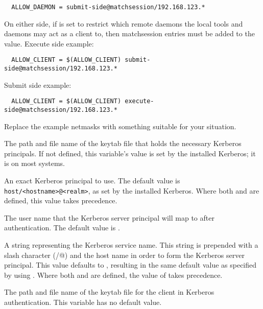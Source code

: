 \begin{description}
\begin{verbatim}
  ALLOW_DAEMON = submit-side@matchsession/192.168.123.*
\end{verbatim}

  On either side, if  is set to restrict which
  remote daemons the local tools and daemons may act as a client to, then
  matchsession entries must be added to the  value.
  Execute side example:

\begin{verbatim}
  ALLOW_CLIENT = $(ALLOW_CLIENT) submit-side@matchsession/192.168.123.*
\end{verbatim}

  Submit side example:

\begin{verbatim}
  ALLOW_CLIENT = $(ALLOW_CLIENT) execute-side@matchsession/192.168.123.*
\end{verbatim}

  Replace the example netmasks with something suitable for your situation.

\label{param:KerberosServerKeytab}
\item[\Macro{KERBEROS\_SERVER\_KEYTAB}]
  The path and file name of the keytab file that holds the necessary Kerberos
  principals.
  If not defined, this variable's value is set by the installed Kerberos;
  it is  on most systems.

\label{param:KerberosServerPrincipal}
\item[\Macro{KERBEROS\_SERVER\_PRINCIPAL}]
  An exact Kerberos principal to use.
  The default value is \verb$host/<hostname>@<realm>$, as set by the
  installed Kerberos.
  Where both  and
   are defined, this value takes
  precedence.

\label{param:KerberosServerUser}
\item[\Macro{KERBEROS\_SERVER\_USER}]
  The user name that the Kerberos server principal will map to after
  authentication.
  The default value is \verb@condor@.

\label{param:KerberosServerService}
\item[\Macro{KERBEROS\_SERVER\_SERVICE}]
  A string representing the Kerberos service name.
  This string is prepended with a slash character (\verb@/@) and the host name
  in order to form the Kerberos server principal.
  This value defaults to \verb@host@, resulting in the same default value
  as specified by using .
  Where both  and
   are defined, the value of
   takes precedence.


\label{param:KerberosClientKeytab}
\item[\Macro{KERBEROS\_CLIENT\_KEYTAB}]
  The path and file name of the keytab file for the client
  in Kerberos authentication.
  This variable has no default value.

\end{description}

